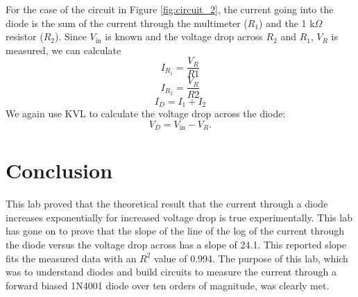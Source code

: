 \documentclass[12pt,letterpaper]{report}
\begin{document}
For the case of the circuit in Figure \ref{fig:circuit_2}, the current going into the diode is the sum of the current through the multimeter ($R_1$) and the 1 k$\Omega$ resistor ($R_2$). Since $V_{\text{in}}$ is known and the voltage drop across $R_2$ and $R_1$, $V_R$ is measured, we can calculate
$$
I_{R_1} = \frac{V_R}{R1}
$$
$$
I_{R_2} = \frac{V_R}{R2}
$$
$$
I_D = I_1 + I_2
$$
We again use KVL to calculate the voltage drop across the diode:
$$
V_D = V_{\text{in}} - V_R.
$$

\section*{Conclusion}

This lab proved that the theoretical result that the current through a diode increases exponentially for increased voltage drop is true experimentally. This lab has gone on to prove that the slope of the line of the log of the current through the diode versus the voltage drop across has a slope of 24.1. This reported slope fits the measured data with an $R^2$ value of 0.994. The purpose of this lab, which was to understand diodes and build circuits to measure the current through a forward biased 1N4001 diode over ten orders of magnitude, was clearly met.
\end{document}
